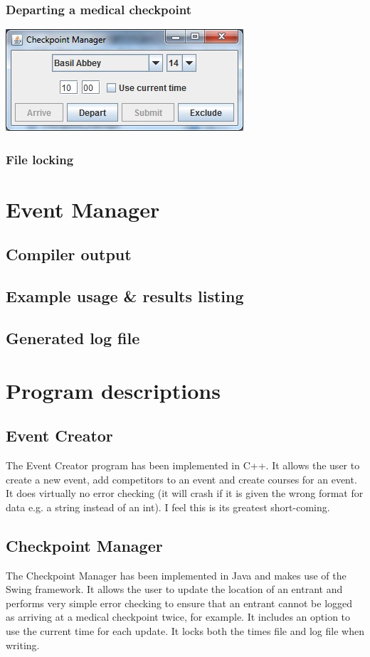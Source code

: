 \documentclass[a4paper, twoside]{article}
\begin{document}
\subsubsection{Departing a medical checkpoint}
\includegraphics{screenshot3.jpg}
\subsubsection{File locking}

\section{Event Manager}
\subsection{Compiler output}

\subsection{Example usage \& results listing}

\subsection{Generated log file}

\section{Program descriptions}
\subsection{Event Creator}
The Event Creator program has been implemented in C++. It allows the user to
create a new event, add competitors to an event and create courses for an event.
It does virtually no error checking (it will crash if it is given the wrong
format for data e.g. a string instead of an int). I feel this is its greatest
short-coming.
\subsection{Checkpoint Manager}
The Checkpoint Manager has been implemented in Java and makes use of the Swing
framework. It allows the user to update the location of an entrant and performs
very simple error checking to ensure that an entrant cannot be logged as
arriving at a medical checkpoint twice, for example. It includes an option to
use the current time for each update. It locks both the times file and log file
when writing.
\end{document}
